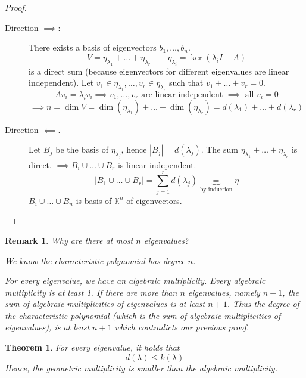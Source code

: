 \documentclass{article}
\newcounter{lecref}[section]
\numberwithin{lecref}{section}
\newtheorem{theorem}[lecref]{Theorem}
\newtheorem{remark}[lecref]{Remark}
\newcommand{\card}[1]{\left|#1\right|}
\begin{document}
\begin{proof} \hfill{}
  \begin{description}
    \item[Direction $\implies$:]
      There exists a basis of eigenvectors $b_1, \dots, b_n$.
      \[ V = \eta_{\lambda_1} + \dots + \eta_{\lambda_r} \qquad \eta_{\lambda_i} = \ker(\lambda_i I - A) \]
      is a direct sum (because eigenvectors for different eigenvalues are linear independent).
      Let $v_1 \in \eta_{\lambda_1}, \dots, v_r \in \eta_{\lambda_r}$ such that $v_1 + \dots + v_r = 0$.
      \[ A v_i = \lambda_i v_i \implies v_1, \dots, v_r \text{ are linear independent } \implies \text{ all } v_i = 0 \]
      \[ \implies n = \dim{V} = \dim(\eta_{\lambda_1}) + \dots + \dim(\eta_{\lambda_r}) = d(\lambda_1) + \dots + d(\lambda_r) \]
    \item[Direction $\impliedby$.]
      Let $B_j$ be the basis of $\eta_{\lambda_j}$, hence $\card{B_j} = d(\lambda_j)$.
      The sum $\eta_{\lambda_1} + \dots + \eta_{\lambda_r}$ is direct.
      $\implies B_i \cup \dots \cup B_r$ is linear independent.
      \[ \card{B_1 \cup \dots \cup B_r} = \sum_{j=1}^r d(\lambda_j) \underbrace{=}_{\text{by induction}} \eta \]
      $B_i \cup \dots \cup B_n$ is basis of $\mathbb K^n$ of eigenvectors.
  \end{description}
\end{proof}

\begin{remark}
  Why are there at most $n$ eigenvalues?

  We know the characteristic polynomial has degree $n$.

  For every eigenvalue, we have an algebraic multiplicity. Every algebraic multiplicity is at least 1.
  If there are more than $n$ eigenvalues, namely $n+1$, the sum of algebraic multiplicities of eigenvalues is at least $n+1$.
  Thus the degree of the characteristic polynomial (which is the sum of algebraic multiplicities of eigenvalues), is at least $n+1$ which contradicts our previous proof.
\end{remark}

\begin{theorem} %
  For every eigenvalue, it holds that
  \[ d(\lambda) \leq k(\lambda) \]
  Hence, the geometric multiplicity is smaller than the algebraic multiplicity.
\end{theorem}
\end{document}
